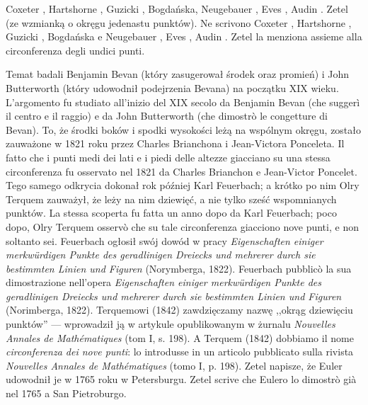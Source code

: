 
Coxeter \cite[s. 34, 35, 88]{coxeter_1967}, Hartshorne \cite[s. 57, 60]{hartshorne_2000}, Guzicki \cite[s. 223]{guzicki_2021}, Bogdańska, Neugebauer \cite[s. 85, 86]{neugebauer_2018}, Eves \cite[s. 109]{eves1_1972}, Audin \cite[s. 62]{audin_2003}. Zetel \cite[s. 59, 85]{zetel_2020} (ze wzmianką o okręgu jedenastu punktów). %
Ne scrivono Coxeter \cite[p. 34, 35, 88]{coxeter_1967}, Hartshorne \cite[p. 57, 60]{hartshorne_2000}, Guzicki \cite[p. 223]{guzicki_2021}, Bogdańska e Neugebauer \cite[p. 85, 86]{neugebauer_2018}, Eves \cite[p. 109]{eves1_1972}, Audin \cite[p. 62]{audin_2003}. Zetel \cite[p. 59, 85]{zetel_2020} la menziona assieme alla circonferenza degli undici punti. %

Temat badali Benjamin Bevan (który zasugerował środek oraz promień) i John Butterworth (który udowodnił podejrzenia Bevana) na początku XIX wieku. %
L'argomento fu studiato all'inizio del XIX secolo da Benjamin Bevan (che suggerì il centro e il raggio) e da John Butterworth (che dimostrò le congetture di Bevan). %
%
%
To, że środki boków i spodki wysokości leżą na wspólnym okręgu, zostało zauważone w 1821 roku przez Charles Brianchona i Jean-Victora Ponceleta. %
Il fatto che i punti medi dei lati e i piedi delle altezze giacciano su una stessa circonferenza fu osservato nel 1821 da Charles Brianchon e Jean-Victor Poncelet. %
%
%
Tego samego odkrycia dokonał rok później Karl Feuerbach; a krótko po nim Olry Terquem zauważył, że leży na nim dziewięć, a nie tylko sześć wspomnianych punktów. %
La stessa scoperta fu fatta un anno dopo da Karl Feuerbach; poco dopo, Olry Terquem osservò che su tale circonferenza giacciono nove punti, e non soltanto sei. %
Feuerbach ogłosił swój dowód w pracy \emph{Eigenschaften einiger merkwürdigen Punkte des geradlinigen Dreiecks und mehrerer durch sie bestimmten Linien und Figuren} (Norymberga, 1822). %
Feuerbach pubblicò la sua dimostrazione nell'opera \emph{Eigenschaften einiger merkwürdigen Punkte des geradlinigen Dreiecks und mehrerer durch sie bestimmten Linien und Figuren} (Norimberga, 1822). %
%
%
Terquemowi (1842) zawdzięczamy nazwę ,,okrąg dziewięciu punktów'' — wprowadził ją w artykule opublikowanym w żurnalu \emph{Nouvelles Annales de Mathématiques} (tom I, s. 198). %
A Terquem (1842) dobbiamo il nome \emph{circonferenza dei nove punti}: lo introdusse in un articolo pubblicato sulla rivista \emph{Nouvelles Annales de Mathématiques} (tomo I, p. 198). %
Zetel napisze, że Euler udowodnił je w 1765 roku w Petersburgu. %
Zetel scrive che Eulero lo dimostrò già nel 1765 a San Pietroburgo. %


